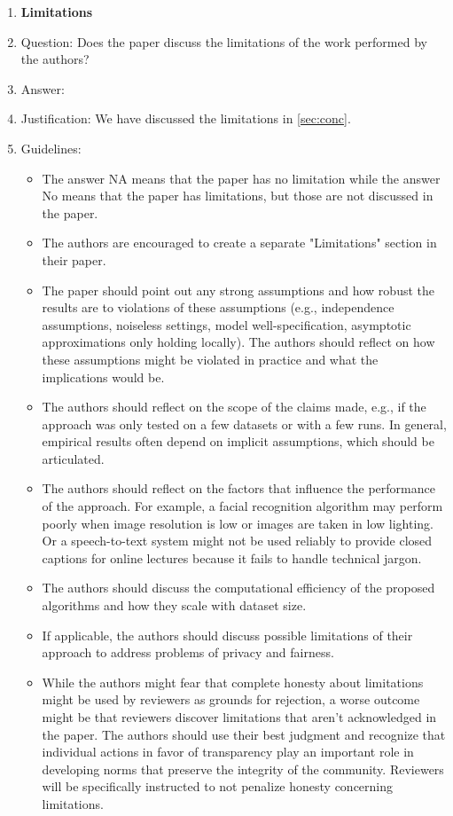 \documentclass{article}
\theoremstyle{remark}
\begin{document}
\begin{enumerate}
\item {\bf Limitations}
    \item[] Question: Does the paper discuss the limitations of the work performed by the authors?
    \item[] Answer: \answerYes{} %
    \item[] Justification: We have discussed the limitations in \cref{sec:conc}.
    \item[] Guidelines:
    \begin{itemize}
        \item The answer NA means that the paper has no limitation while the answer No means that the paper has limitations, but those are not discussed in the paper. 
        \item The authors are encouraged to create a separate "Limitations" section in their paper.
        \item The paper should point out any strong assumptions and how robust the results are to violations of these assumptions (e.g., independence assumptions, noiseless settings, model well-specification, asymptotic approximations only holding locally). The authors should reflect on how these assumptions might be violated in practice and what the implications would be.
        \item The authors should reflect on the scope of the claims made, e.g., if the approach was only tested on a few datasets or with a few runs. In general, empirical results often depend on implicit assumptions, which should be articulated.
        \item The authors should reflect on the factors that influence the performance of the approach. For example, a facial recognition algorithm may perform poorly when image resolution is low or images are taken in low lighting. Or a speech-to-text system might not be used reliably to provide closed captions for online lectures because it fails to handle technical jargon.
        \item The authors should discuss the computational efficiency of the proposed algorithms and how they scale with dataset size.
        \item If applicable, the authors should discuss possible limitations of their approach to address problems of privacy and fairness.
        \item While the authors might fear that complete honesty about limitations might be used by reviewers as grounds for rejection, a worse outcome might be that reviewers discover limitations that aren't acknowledged in the paper. The authors should use their best judgment and recognize that individual actions in favor of transparency play an important role in developing norms that preserve the integrity of the community. Reviewers will be specifically instructed to not penalize honesty concerning limitations.
    \end{itemize}


\end{enumerate}
\end{document}
